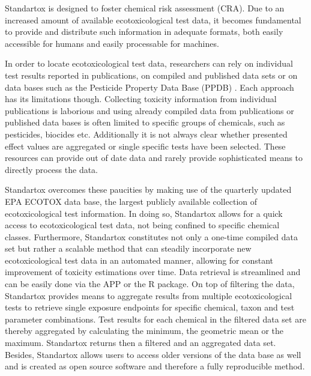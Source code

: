 






\pagebreak


\pagebreak


\pagebreak

Standartox is designed to foster chemical risk assessment (CRA). Due to an increased amount of available ecotoxicological test data, it becomes fundamental to provide and distribute such information in adequate formats, both easily accessible for humans and easily processable for machines. 






In order to locate ecotoxicological test data, researchers can rely on individual test results reported in publications, on compiled and published data sets \citep{malaj_organic_2014, morrissey_neonicotinoid_2015} or on data bases such as the Pesticide Property Data Base (PPDB) \citep{lewis_international_2016}. Each approach has its limitations though. Collecting toxicity information from individual publications is laborious and using already compiled data from publications or published data bases is often limited to specific groups of chemicals, such as pesticides, biocides etc. Additionally it is not always clear whether presented effect values are aggregated or single specific tests have been selected. These resources can provide out of date data and rarely provide sophisticated means to directly process the data.



Standartox overcomes these paucities by making use of the quarterly updated EPA ECOTOX data base, the largest publicly available collection of ecotoxicological test information. In doing so, Standartox allows for a quick access to ecotoxicological test data, not being confined to specific chemical classes. Furthermore, Standartox constitutes not only a one-time compiled data set but rather a scalable method that can steadily incorporate new ecotoxicological test data in an automated manner, allowing for constant improvement of toxicity estimations over time. Data retrieval is streamlined and can be easily done via the APP or the R package. On top of filtering the data, Standartox provides means to aggregate results from multiple ecotoxicological tests to retrieve single exposure endpoints for specific chemical, taxon and test parameter combinations. Test results for each chemical in the filtered data set are thereby aggregated by calculating the minimum, the geometric mean or the maximum. Standartox returns then a filtered and an aggregated data set. Besides, Standartox allows users to access older versions of the data base as well and is created as open source software and therefore a fully reproducible method.

